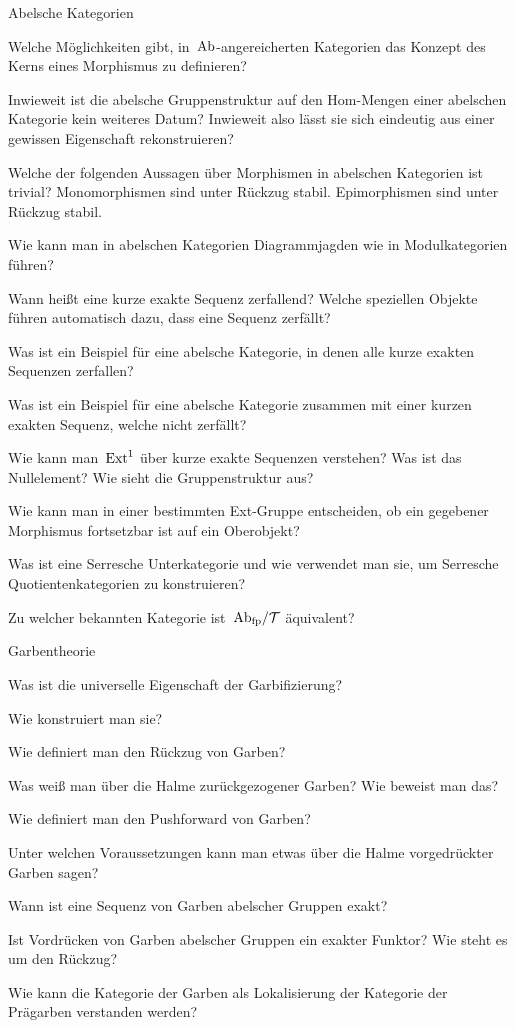 \documentclass{uebblatt}
\begin{document}
\begin{aufgabeE}{Abelsche Kategorien}
\item Welche Möglichkeiten gibt, in~$\mathrm{Ab}$-angereicherten Kategorien das Konzept
des Kerns eines Morphismus zu definieren?
\item Inwieweit ist die abelsche Gruppenstruktur auf den Hom-Mengen einer
abelschen Kategorie kein weiteres Datum? Inwieweit also lässt sie sich
eindeutig aus einer gewissen Eigenschaft rekonstruieren?
\item Welche der folgenden Aussagen über Morphismen in abelschen Kategorien ist
trivial? Monomorphismen sind unter Rückzug stabil. Epimorphismen sind unter
Rückzug stabil.
\item Wie kann man in abelschen Kategorien Diagrammjagden wie in
Modulkategorien führen?
\item Wann heißt eine kurze exakte Sequenz zerfallend? Welche speziellen
Objekte führen automatisch dazu, dass eine Sequenz zerfällt?
\item Was ist ein Beispiel für eine abelsche Kategorie, in denen alle kurze
exakten Sequenzen zerfallen?
\item Was ist ein Beispiel für eine abelsche Kategorie zusammen mit einer
kurzen exakten Sequenz, welche nicht zerfällt?
\item Wie kann man~$\mathrm{Ext}^1$ über kurze exakte Sequenzen verstehen? Was ist das
Nullelement? Wie sieht die Gruppenstruktur aus?
\item Wie kann man in einer bestimmten Ext-Gruppe entscheiden, ob ein gegebener
Morphismus fortsetzbar ist auf ein Oberobjekt?
\item Was ist eine Serresche Unterkategorie und wie verwendet man sie, um
Serresche Quotientenkategorien zu konstruieren?
\item Zu welcher bekannten Kategorie ist~$\mathrm{Ab}_\text{fp}/\mathcal{T}$ äquivalent?
\end{aufgabeE}

\begin{aufgabeE}{Garbentheorie}
\item Was ist die universelle Eigenschaft der Garbifizierung?
\item Wie konstruiert man sie?
\item Wie definiert man den Rückzug von Garben?
\item Was weiß man über die Halme zurückgezogener Garben? Wie beweist man das?
\item Wie definiert man den Pushforward von Garben?
\item Unter welchen Voraussetzungen kann man etwas über die Halme vorgedrückter
Garben sagen?
\item Wann ist eine Sequenz von Garben abelscher Gruppen exakt?
\item Ist Vordrücken von Garben abelscher Gruppen ein exakter Funktor? Wie
steht es um den Rückzug?
\item Wie kann die Kategorie der Garben als Lokalisierung der Kategorie der
Prägarben verstanden werden?
\end{aufgabeE}
\end{document}
